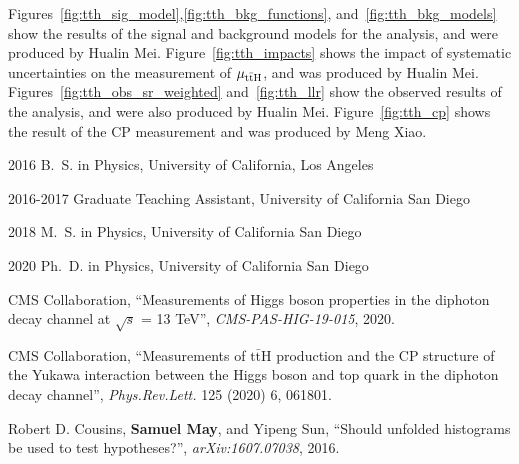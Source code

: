 \begin{frontmatter}
\begin{acknowledgements}
    Figures~\ref{fig:tth_sig_model},\ref{fig:tth_bkg_functions}, and~\ref{fig:tth_bkg_models} show the results of the signal and background models for the \ttH analysis, and were produced by Hualin Mei.
    Figure~\ref{fig:tth_impacts} shows the impact of systematic uncertainties on the measurement of $\mu_{\mathrm{t\bar{t}H}}$, and was produced by Hualin Mei.
    Figures~\ref{fig:tth_obs_sr_weighted} and~\ref{fig:tth_llr} show the observed results of the \ttH analysis, and were also produced by Hualin Mei.
    Figure~\ref{fig:tth_cp} shows the result of the \ttH CP measurement and was produced by Meng Xiao.
\end{acknowledgements}


%
%
\begin{vitapage}
\begin{vita}
  \item[2016] B.~S. in Physics, University of California, Los Angeles
  \item[2016-2017] Graduate Teaching Assistant, University of California San Diego
  \item[2018] M.~S. in Physics, University of California San Diego
  \item[2020] Ph.~D. in Physics, University of California San Diego
\end{vita}
\begin{publications}
  \item CMS Collaboration, ``Measurements of Higgs boson properties in the diphoton decay channel at $\sqrt{s}$ = 13 TeV'', \emph{CMS-PAS-HIG-19-015}, 2020.
  \item CMS Collaboration, ``Measurements of $\mathrm{t\bar{t}}$H production and the CP structure of the Yukawa interaction between the Higgs boson and top quark in the diphoton decay channel'', \emph{Phys.Rev.Lett.} 125 (2020) 6, 061801.
  \item Robert D. Cousins, \textbf{Samuel May}, and Yipeng Sun, ``Should unfolded histograms be used to test hypotheses?'', \emph{arXiv:1607.07038}, 2016.
\end{publications}
\end{vitapage}



\end{frontmatter}
